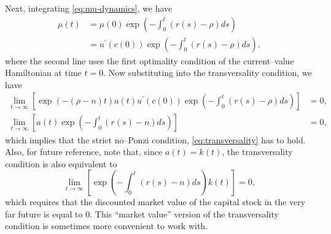 \documentclass[\topdir/lecture\_notes.tex]{subfiles}
\begin{document}
Next, integrating \eqref{eq:mu-dynamics}, we have
\[
  \begin{aligned}
    \mu(t) & =\mu(0) \exp \left(-\int_{0}^{t}(r(s)-\rho) ds\right)           \\
           & =u^{\prime}(c(0)) \exp \left(-\int_{0}^{t}(r(s)-\rho) ds\right),
  \end{aligned}
\]
where the second line uses the first optimality condition of the current--value Hamiltonian at time $t=0$.
Now substituting into the transversality condition, we have
\[
  \begin{aligned}
    \lim _{t \rightarrow \infty}\left[\exp(-(\rho-n) t) a(t) u^{\prime}(c(0)) \exp \left(-\int_{0}^{t}(r(s)-\rho) ds\right)\right] & =0, \\
    \lim _{t \rightarrow \infty}\left[a(t) \exp \left(-\int_{0}^{t}(r(s)-n) ds\right)\right]                                       & =0,
  \end{aligned}
\]
which implies that the strict no--Ponzi condition, \eqref{eq:transversality} has to hold.
Also, for future reference, note that, since $a(t)=k(t)$, the transversality condition is also equivalent to
\[
  \lim _{t \rightarrow \infty}\left[\exp \left(-\int_{0}^{t}(r(s)-n) ds\right) k(t)\right]=0,
\]
which requires that the discounted market value of the capital stock in the very far future is equal to 0.
This ``market value'' version of the transversality condition is sometimes more convenient to work with.
\end{document}
